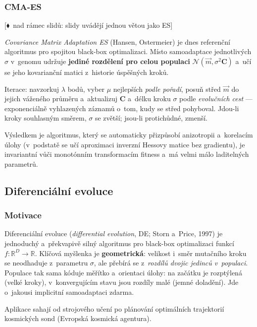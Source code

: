 \documentclass[11pt,a4paper]{article}
\theoremstyle{definition}
\newcommand{\mimoq}[1]{\textcolor{markcol}{\textsf{\footnotesize[$\blacklozenge$~nad rámec slidů: #1]}}}
\begin{document}
\subsubsection{CMA-ES}

\noindent\mimoq{slidy uvádějí jednou větou jako \uv{dnes nejúspěšnější a~nejsložitější} ES}

\begin{defbox}
\emph{Covariance Matrix Adaptation ES} (Hansen, Ostermeier) je dnes referenční algoritmus
pro spojitou black-box optimalizaci. Místo samoadaptace jednotlivých $\sigma$ v~genomu
udržuje \textbf{jediné rozdělení pro celou populaci}
$\mathcal{N}(\vec m, \sigma^2 \mathbf{C})$ a~učí se jeho kovarianční matici z~historie
úspěšných kroků.

Iterace: navzorkuj $\lambda$ bodů, vyber $\mu$ nejlepších \emph{podle pořadí}, posuň střed
$\vec m$ do jejich váženého průměru a~aktualizuj $\mathbf{C}$ a~délku kroku $\sigma$ podle
\emph{evolučních cest} --- exponenciálně vyhlazených záznamů o~tom, kudy se střed pohyboval.
Jdou-li kroky souhlasným směrem, $\sigma$ se zvětší; jsou-li protichůdné, zmenší.
\end{defbox}

Výsledkem je algoritmus, který se automaticky přizpůsobí anizotropii a~korelacím úlohy
(v~podstatě se učí aproximaci inverzní Hessovy matice bez gradientu), je invariantní vůči
monotónním transformacím fitness a~má velmi málo laditelných parametrů.

\subsection{Diferenciální evoluce}
\label{sec:de}
\subsubsection{Motivace}

Diferenciální evoluce (\emph{differential evolution}, DE; Storn a~Price, 1997)
je jednoduchý a~překvapivě silný algoritmus pro black-box optimalizaci funkcí
$f: \mathbb{R}^D \to \mathbb{R}$. Klíčová myšlenka je \textbf{geometrická}:
velikost i~směr mutačního kroku se neodhaduje z~parametru $\sigma$, ale
přebírá se z~\emph{rozdílů dvojic jedinců v~populaci}. Populace tak sama
kóduje měřítko a~orientaci úlohy: na začátku je rozptýlená (velké kroky),
v~konvergujícím stavu jsou rozdíly malé (jemné doladění). Jde o~jakousi
implicitní samoadaptaci zdarma.

Aplikace sahají od strojového učení po plánování optimálních trajektorií
kosmických sond (Evropská kosmická agentura).
\end{document}
